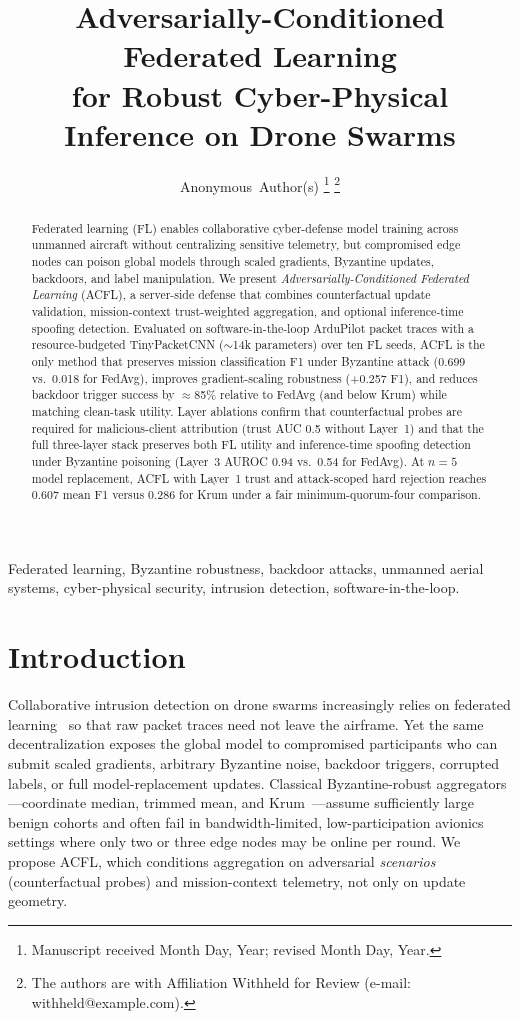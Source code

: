 \documentclass[journal]{IEEEtran}
\title{Adversarially-Conditioned Federated Learning\\
  for Robust Cyber-Physical Inference on Drone Swarms}
\author{Anonymous~Author(s)%
\thanks{Manuscript received Month Day, Year; revised Month Day, Year.}%
\thanks{The authors are with Affiliation Withheld for Review
(e-mail: withheld@example.com).}}
\begin{document}
\maketitle

\begin{abstract}
Federated learning (FL) enables collaborative cyber-defense model training across unmanned aircraft without centralizing sensitive telemetry, but compromised edge nodes can poison global models through scaled gradients, Byzantine updates, backdoors, and label manipulation.
We present \emph{Adversarially-Conditioned Federated Learning} (ACFL), a server-side defense that combines counterfactual update validation, mission-context trust-weighted aggregation, and optional inference-time spoofing detection.
Evaluated on software-in-the-loop ArduPilot packet traces with a resource-budgeted TinyPacketCNN ($\sim$14k parameters) over ten FL seeds, ACFL is the only method that preserves mission classification F1 under Byzantine attack (0.699 vs.\ 0.018 for FedAvg), improves gradient-scaling robustness (+0.257 F1), and reduces backdoor trigger success by $\approx$85\% relative to FedAvg (and below Krum) while matching clean-task utility.
Layer ablations confirm that counterfactual probes are required for malicious-client attribution (trust AUC 0.5 without Layer~1) and that the full three-layer stack preserves both FL utility and inference-time spoofing detection under Byzantine poisoning (Layer~3 AUROC 0.94 vs.\ 0.54 for FedAvg).
At $n{=}5$ model replacement, ACFL with Layer~1 trust and attack-scoped hard rejection reaches 0.607 mean F1 versus 0.286 for Krum under a fair minimum-quorum-four comparison.
\end{abstract}

\begin{IEEEkeywords}
Federated learning, Byzantine robustness, backdoor attacks, unmanned aerial systems, cyber-physical security, intrusion detection, software-in-the-loop.
\end{IEEEkeywords}

\section{Introduction}
\label{sec:intro}

Collaborative intrusion detection on drone swarms increasingly relies on federated learning~\cite{mcmahan2017fedavg,lim2020federated} so that raw packet traces need not leave the airframe.
Yet the same decentralization exposes the global model to compromised participants who can submit scaled gradients, arbitrary Byzantine noise, backdoor triggers, corrupted labels, or full model-replacement updates.
Classical Byzantine-robust aggregators---coordinate median, trimmed mean, and Krum~\cite{blanchard2017krum,yin2018trimmed,chen2017median}---assume sufficiently large benign cohorts and often fail in bandwidth-limited, low-participation avionics settings where only two or three edge nodes may be online per round.
We propose ACFL, which conditions aggregation on adversarial \emph{scenarios} (counterfactual probes) and mission-context telemetry, not only on update geometry.
\end{document}
